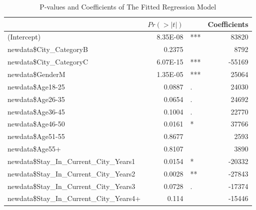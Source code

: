 \documentclass{zjureport}
\begin{document}
\begin{table}[htbp]
	\centering
	\caption{P-values and Coefficients of The Fitted Regression Model}
    \begin{tabular}{lrrr}
    	\toprule[1.5pt]
	& \multicolumn{1}{l}{$Pr(>|t|)$} &       & \multicolumn{1}{l}{Coefficients} \\
	\hline
	(Intercept) & 8.35E-08 & \multicolumn{1}{l}{***} & 83820 \\
	newdata\$City\_CategoryB & 0.2375 &       & 8792 \\
	newdata\$City\_CategoryC & 6.07E-15 & \multicolumn{1}{l}{***} & -55169 \\
	newdata\$GenderM & 1.35E-05 & \multicolumn{1}{l}{***} & 25064 \\
	newdata\$Age18-25 & 0.0887 & \multicolumn{1}{l}{.} & 24030 \\
	newdata\$Age26-35 & 0.0654 & \multicolumn{1}{l}{.} & 24692 \\
	newdata\$Age36-45 & 0.1004 & \multicolumn{1}{l}{.} & 22770 \\
	newdata\$Age46-50 & 0.0161 & \multicolumn{1}{l}{*} & 37766 \\
	newdata\$Age51-55 & 0.8677 &       & 2593 \\
	newdata\$Age55+ & 0.8107 &       & 3890 \\
	newdata\$Stay\_In\_Current\_City\_Years1 & 0.0154 & \multicolumn{1}{l}{*} & -20332 \\
	newdata\$Stay\_In\_Current\_City\_Years2 & 0.0028 & \multicolumn{1}{l}{**} & -27843 \\
	newdata\$Stay\_In\_Current\_City\_Years3 & 0.0728 & \multicolumn{1}{l}{.} & -17374 \\
	newdata\$Stay\_In\_Current\_City\_Years4+ & 0.114 &       & -15446 \\
	\toprule[1.5pt]
\end{tabular}%
	\label{fitted model}%
\end{table}
	
\end{document}
